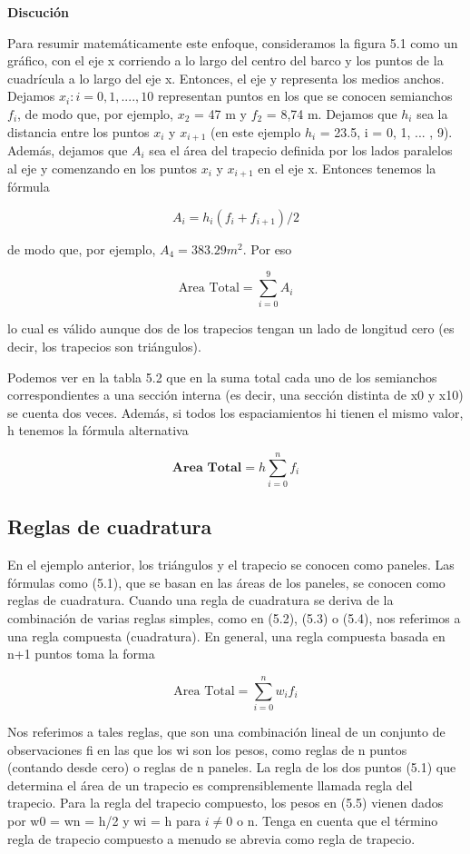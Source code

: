 \documentclass[12pt, letterpaper, twoside]{article}
\begin{document}
\hfill

\textbf{Discución}

\hfill

Para resumir matemáticamente este enfoque, consideramos la figura 5.1 como un gráfico, con el eje x corriendo a lo largo del 
centro del barco y los puntos de la cuadrícula a lo largo del eje x. Entonces, el eje y representa los medios anchos. Dejamos $x_i : i = 0, 1, .... , 10$
 representan puntos en los que se conocen semianchos $f_i$, de modo que, por ejemplo, $x_2$ = 47 m y $f_2$ = 8,74 m. 
Dejamos que $h_i$ sea la distancia entre los puntos $x_i$ y $x_{i+1}$ (en este ejemplo $h_i$ = 23.5, i = 0, 1, ... , 9). 
Además, dejamos que $A_i$ sea el área del trapecio definida por los lados paralelos al eje y comenzando en los 
puntos $x_i$ y $x_{i+1}$ en el eje x. Entonces tenemos la fórmula

\[
A_i = h_i(f_i + f_{i+1})/2
\]

de modo que, por ejemplo, $A_4 = 383.29 m^2$. Por eso

\[
\text{Area Total} = \sum_{i=0}^9 A_i
\]

lo cual es válido aunque dos de los trapecios tengan un lado de longitud cero (es decir, los trapecios son triángulos).

Podemos ver en la tabla 5.2 que en la suma total cada uno de los semianchos correspondientes a una sección interna (es decir, una sección distinta de x0 y x10) se cuenta dos veces. Además, si todos los espaciamientos hi tienen el mismo valor, h tenemos la fórmula alternativa

\[
\textbf{Area Total} = h \sum_{i=0}^n f_i
\]

 
\subsection{Reglas de cuadratura}

En el ejemplo anterior, los triángulos y el trapecio se conocen como paneles. Las fórmulas como (5.1), que se basan en las áreas de los paneles, se conocen como reglas de cuadratura. Cuando una regla de cuadratura se deriva de la combinación de varias reglas simples, como en (5.2), (5.3) o (5.4), nos referimos a una regla compuesta (cuadratura). En general, una regla compuesta basada en n+1 puntos toma la forma

\[
\text{Area Total} = \sum_{i=0}^n w_i f_i
\]

Nos referimos a tales reglas, que son una combinación lineal de un conjunto de observaciones fi en las que los wi son los pesos, como reglas de n puntos (contando desde cero) o reglas de n paneles. La regla de los dos puntos (5.1) que determina el área de un trapecio es comprensiblemente llamada regla del trapecio. Para la regla del trapecio compuesto, los pesos en (5.5) vienen dados por w0 = wn = h/2 y wi = h para $i \neq 0$ o n. Tenga en cuenta que el término regla de trapecio compuesto a menudo se abrevia como regla de trapecio.
\end{document}
